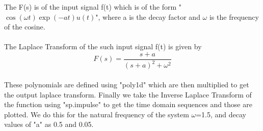 \documentclass[11pt, a4paper]{article}
\begin{document}
	The F(s) is of the input signal f(t) which is of the form "\(\cos{(\omega t)}\exp(-at)u(t)\)", where a is the decay factor and $\omega$ is the frequency of the cosine.\\
\\The Laplace Transform of the such input signal f(t) is given by\\ \[ F(s) = \frac{s+a}{(s+a)^2+\omega^2 }\]\\ These polynomials are defined using "poly1d" which are then multiplied to get the output laplace transform. Finally we take the Inverse Laplace Transform of the function using "sp.impulse" to get the time domain sequences and those are plotted. We do this for the natural frequency of the system $\omega$=1.5, and decay values of "a" as 0.5 and 0.05.\\
    	
\end{document}
